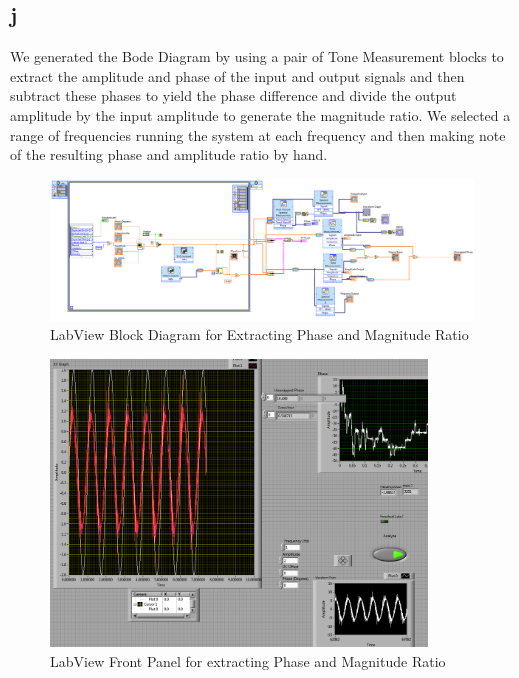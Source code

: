 \documentclass{article}
\theoremstyle{plain}
\theoremstyle{definition}
\theoremstyle{remark}
\begin{document}
\subsection*{j}

We generated the Bode Diagram by using a pair of Tone Measurement blocks to extract the amplitude and phase of the input and output signals and then subtract these phases to yield the phase difference and divide the output amplitude by the input amplitude to generate the magnitude ratio.  We selected a range of frequencies running the system at each frequency and then making note of the resulting phase and amplitude ratio by hand.

\begin{figure}[h]
\begin{center}
\includegraphics[width = 17cm]{blockDiagram.png}
\caption{LabView Block Diagram for Extracting Phase and Magnitude Ratio}
\label{q1_j1}
\end{center}
\end{figure}

\begin{figure}[h]
\begin{center}
\includegraphics[width = 10cm]{frontPannel.png}
\caption{LabView Front Panel for extracting Phase and Magnitude Ratio}
\label{q1_j2}
\end{center}
\end{figure}
\end{document}
